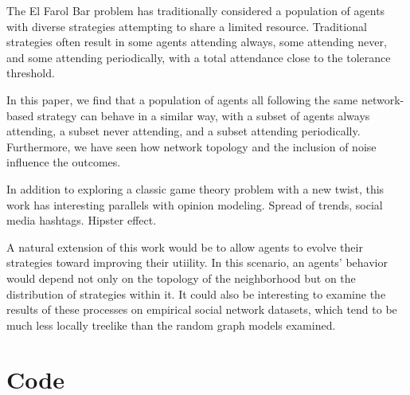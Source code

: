 \documentclass[12pt]{article}
\begin{document}
The El Farol Bar problem has traditionally considered a population of agents with diverse strategies attempting to share a limited resource.  Traditional strategies often result in some agents attending always, some attending never, and some attending periodically, with a total attendance close to the tolerance threshold.

In this paper, we find that a population of agents all following the same network-based strategy can behave in a similar way, with a subset of agents always attending, a subset never attending, and a subset attending periodically.  Furthermore, we have seen how network topology and the inclusion of noise influence the outcomes.

In addition to exploring a classic game theory problem with a new twist, this work has interesting parallels with opinion modeling.  Spread of trends, social media hashtags.  Hipster effect.

A natural extension of this work would be to allow agents to evolve their strategies toward improving their utiility.  In this scenario, an agents' behavior would depend not only on the topology of the neighborhood but on the distribution of strategies within it.  It could also be interesting to examine the results of these processes on empirical social network datasets, which tend to be much less locally treelike than the random graph models examined.    

\section*{Code}
\end{document}
